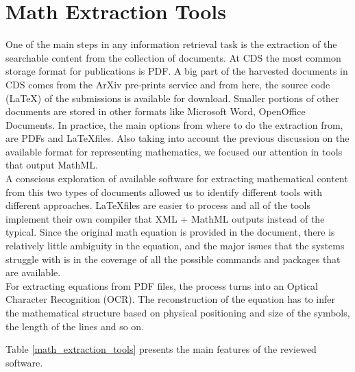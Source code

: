 \section{Math Extraction Tools}
One of the main steps in any information retrieval task is the extraction of the searchable content from the collection of documents. At CDS the most common storage format for publications is PDF. A big part of the harvested documents in CDS comes from the ArXiv pre-prints service and from here, the source code (\LaTeX) of the submissions is available for download. Smaller portions of other documents are stored in other formats like Microsoft Word, OpenOffice Documents.
In practice, the main options from where to do the extraction from, are PDFs and \LaTeX  files. Also taking into account the previous discussion on the available format for representing mathematics, we focused our attention in tools that output MathML.  \\
A conscious exploration of available software for extracting mathematical content from this two types of documents allowed us to identify different tools with different approaches. 
\LaTeX  files are easier to process and all of the tools implement their own compiler that XML + MathML outputs instead of the typical. Since the original math equation is provided in the document, there is relatively little ambiguity in the equation, and the major issues that the systems struggle with is in the coverage of all the possible commands and packages that are available. \\
For extracting equations from PDF files, the process turns into an Optical Character Recognition (OCR). The reconstruction of the equation has to infer the mathematical structure based on physical positioning and size of the symbols, the length of the lines and so on.

Table \ref{math_extraction_tools} presents the main features of the reviewed software. 


